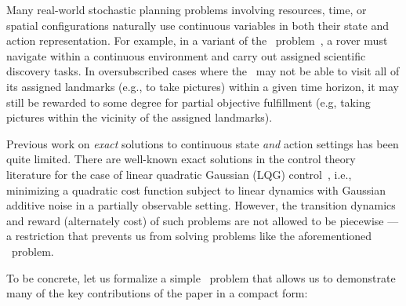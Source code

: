 \label{sec:intro}

Many real-world stochastic planning problems involving resources,
time, or spatial configurations naturally use continuous variables in
both their state and action representation.  For example, in a variant
of the
\MarsRover\ problem~\cite{bresina02}, a rover must navigate within a
continuous environment and carry out assigned scientific discovery
tasks.  In oversubscribed cases where the \MarsRover\ may not be able
to visit all of its assigned landmarks (e.g., to take pictures) within a
given time horizon, it may still be rewarded to some degree for
partial objective fulfillment (e.g, taking pictures within the
vicinity of the assigned landmarks).  

Previous work on \emph{exact} solutions to continuous state \emph{and}
action settings has been quite limited.  There are well-known exact
solutions in the control theory literature for the case of linear
quadratic Gaussian (LQG) control~\cite{lqgc}, i.e., minimizing a quadratic cost
function subject to linear dynamics with Gaussian additive noise in a
partially observable setting.  However, the transition dynamics and
reward (alternately cost) of such problems are not allowed to be
piecewise --- a restriction that prevents us from solving
problems like the aforementioned \MarsRover\ problem.

To be concrete, let us formalize a simple \MarsRover\ problem that
allows us to demonstrate many of the key contributions of the
paper in a compact form:

